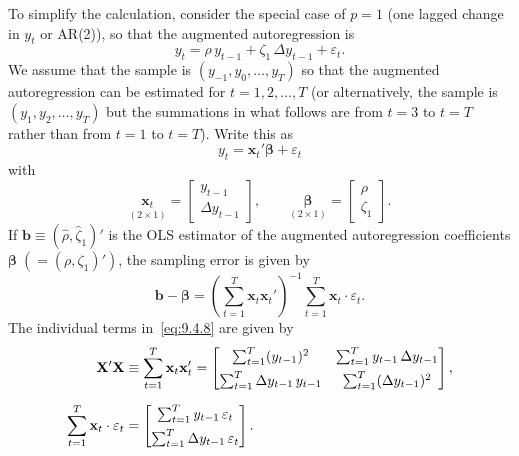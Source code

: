 To simplify the calculation, consider the special case of $p = 1$ (one lagged
change in $y_t$ or AR(2)), so that the augmented autoregression is
\begin{equation}
\label{eq:9.4.6}
y_t = \rho\, y_{t-1} + \zeta_1\,\Delta y_{t-1} + \varepsilon_t.
\end{equation}
We assume that the sample is $(y_{-1}, y_0, \ldots, y_T)$ so that the augmented autoregression can be estimated for $t = 1, 2, \ldots, T$ (or alternatively, the sample is
$(y_1, y_2, \ldots, y_T)$ but the summations in what follows are from $t = 3$ to $t = T$
rather than from $t = 1$ to $t = T$). Write this as
\[
y_t = \mathbf{x}_t' \bm{\beta} + \varepsilon_t
\]
with
\begin{equation}
\label{eq:9.4.7}
\underset{(2 \times 1)}{\mathbf{x}_t} = \begin{bmatrix} y_{t-1} \\ \Delta y_{t-1} \end{bmatrix}, \qquad
\underset{(2 \times 1)}{\bm{\beta}} = \begin{bmatrix} \rho \\ \zeta_1 \end{bmatrix}.
\end{equation}
If $\mathbf{b} \equiv (\hat{\rho}, \hat{\zeta}_1)'$ is the OLS estimator of the augmented autoregression coefficients
$\bm{\beta}\; (= (\rho, \zeta_1)')$, the sampling error is given by
\begin{equation}
\label{eq:9.4.8}
\mathbf{b} - \bm{\beta}
= \left(\sum_{t=1}^{T} \mathbf{x}_t \mathbf{x}_t'\right)^{-1} \sum_{t=1}^{T} \mathbf{x}_t \cdot \varepsilon_t.
\end{equation}
The individual terms in~\eqref{eq:9.4.8} are given by
\begin{align}
\mathbf{X}'\mathbf{X} &\equiv \sum_{t=1}^{T} \mathbf{x}_t \mathbf{x}_t'
= \begin{bmatrix}
\sum_{t=1}^{T}(y_{t-1})^2 & \sum_{t=1}^{T} y_{t-1}\,\Delta y_{t-1} \\[4pt]
\sum_{t=1}^{T} \Delta y_{t-1}\, y_{t-1} & \sum_{t=1}^{T} (\Delta y_{t-1})^2
\end{bmatrix}, \notag \\[6pt]
\sum_{t=1}^{T} \mathbf{x}_t \cdot \varepsilon_t
&= \begin{bmatrix}
\sum_{t=1}^{T} y_{t-1}\, \varepsilon_t \\[4pt]
\sum_{t=1}^{T} \Delta y_{t-1}\, \varepsilon_t
\end{bmatrix}.
\label{eq:9.4.9}
\end{align}

